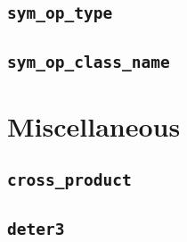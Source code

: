 \subsection{{\tt sym\_op\_type}}

\subsection{{\tt sym\_op\_class\_name}}

\section{Miscellaneous}

\subsection{{\tt cross\_product}}

\subsection{{\tt deter3}}


